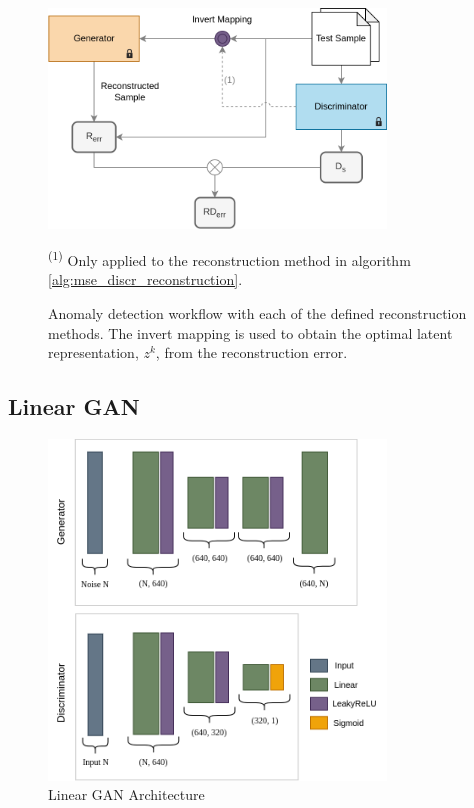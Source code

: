 \begin{figure}[]
    \centering
    \includegraphics[width=0.8\textwidth]{figures/gan_anomaly_detect_flow.png}
    \caption[Anomaly detection workflow]{Anomaly detection workflow with each of the defined reconstruction methods. The invert mapping is used to obtain the optimal latent representation, $z^k$, from the reconstruction error.}\label{fig:anomaly_detection_method}
    \small\textsuperscript{(1)} Only applied to the reconstruction method in algorithm \ref{alg:mse_discr_reconstruction}.
\end{figure}



\subsection{Linear GAN}\label{sec:linear_gan}

\begin{figure}
    \centering
    \includegraphics[width=0.8\textwidth]{figures/linearGAN.png}
    \caption{Linear GAN Architecture}
    \label{fig:linear_gan_architecture}
\end{figure}


